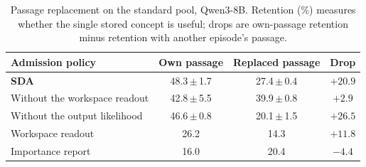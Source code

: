 \begin{table}[t]
\centering
\caption{Passage replacement on the standard pool, Qwen3-8B. Retention (\%) measures whether the
single stored concept is useful; drops are own-passage retention minus retention with another
episode's passage.}
\label{tab:replacedpassage}
\small
\setlength{\tabcolsep}{5pt}
\begin{tabular}{lccc}
\toprule
Admission policy & Own passage & Replaced passage & Drop \\
\midrule
\textbf{SDA} & 48.3\,$\pm$\,1.7 & 27.4\,$\pm$\,0.4 & $+20.9$ \\
Without the workspace readout & 42.8\,$\pm$\,5.5 & 39.9\,$\pm$\,0.8 & $+2.9$ \\
Without the output likelihood & 46.6\,$\pm$\,0.8 & 20.1\,$\pm$\,1.5 & $+26.5$ \\
Workspace readout & 26.2 & 14.3 & $+11.8$ \\
Importance report & 16.0 & 20.4 & $-4.4$ \\
\bottomrule
\end{tabular}
\end{table}
